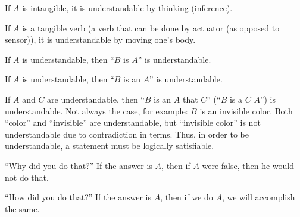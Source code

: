 If \(A\) is intangible, it is understandable by thinking (inference).

If \(A\) is a tangible verb (a verb that can be done by actuator (as opposed to sensor)), it is understandable by moving one's body.

If \(A\) is understandable, then ``\(B\) is \(A\)'' is understandable.

If \(A\) is understandable, then ``\(B\) is an \(A\)'' is understandable.

If \(A\) and \(C\) are understandable,
then ``\(B\) is an \(A\) that \(C\)'' (``\(B\) is a \(C\) \(A\)'') is understandable.
Not always the case, for example: \(B\) is an invisible color.
Both ``color'' and ``invisible'' are understandable,
but ``invisible color'' is not understandable due to contradiction in terms.
Thus, in order to be understandable, a statement must be logically satisfiable.

``Why did you do that?''
If the answer is \(A\), then if \(A\) were false, then he would not do that.

``How did you do that?''
If the answer is \(A\), then if we do \(A\), we will accomplish the same.
